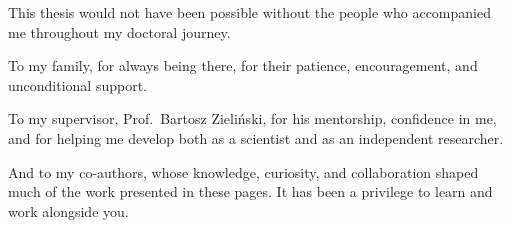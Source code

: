 \thispagestyle{empty}

\vspace*{0.45\textheight}

\begin{flushright}
\begin{minipage}{0.7\textwidth}
\raggedleft
\itshape

This thesis would not have been possible without the people who accompanied me throughout my doctoral journey.

\vspace{1.2em}

To my family, for always being there, for their patience, encouragement, and unconditional support.

\vspace{1.2em}

To my supervisor, Prof.~Bartosz Zieliński, for his mentorship, confidence in me, and for helping me develop both as a scientist and as an independent researcher.

\vspace{1.2em}

And to my co-authors, whose knowledge, curiosity, and collaboration shaped much of the work presented in these pages. It has been a privilege to learn and work alongside you.

\end{minipage}
\end{flushright}

\clearpage
